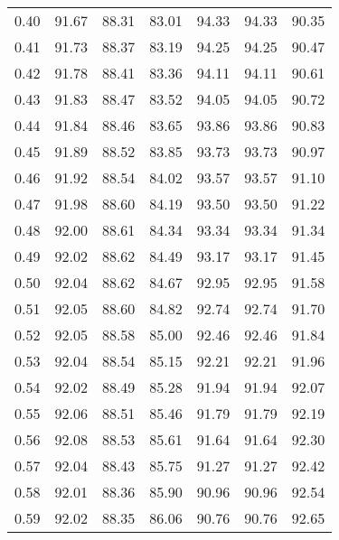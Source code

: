 \begin{tabular}{|c|c|c|c|c|c|c|}
      0.40 &     91.67 &     88.31 &      83.01 &   94.33 &      94.33 &         90.35 \\
      0.41 &     91.73 &     88.37 &      83.19 &   94.25 &      94.25 &         90.47 \\
      0.42 &     91.78 &     88.41 &      83.36 &   94.11 &      94.11 &         90.61 \\
      0.43 &     91.83 &     88.47 &      83.52 &   94.05 &      94.05 &         90.72 \\
      0.44 &     91.84 &     88.46 &      83.65 &   93.86 &      93.86 &         90.83 \\
      0.45 &     91.89 &     88.52 &      83.85 &   93.73 &      93.73 &         90.97 \\
      0.46 &     91.92 &     88.54 &      84.02 &   93.57 &      93.57 &         91.10 \\
      0.47 &     91.98 &     88.60 &      84.19 &   93.50 &      93.50 &         91.22 \\
      0.48 &     92.00 &     88.61 &      84.34 &   93.34 &      93.34 &         91.34 \\
      0.49 &     92.02 &     88.62 &      84.49 &   93.17 &      93.17 &         91.45 \\
      0.50 &     92.04 &     88.62 &      84.67 &   92.95 &      92.95 &         91.58 \\
      0.51 &     92.05 &     88.60 &      84.82 &   92.74 &      92.74 &         91.70 \\
      0.52 &     92.05 &     88.58 &      85.00 &   92.46 &      92.46 &         91.84 \\
      0.53 &     92.04 &     88.54 &      85.15 &   92.21 &      92.21 &         91.96 \\
      0.54 &     92.02 &     88.49 &      85.28 &   91.94 &      91.94 &         92.07 \\
      0.55 &     92.06 &     88.51 &      85.46 &   91.79 &      91.79 &         92.19 \\
      0.56 &     92.08 &     88.53 &      85.61 &   91.64 &      91.64 &         92.30 \\
      0.57 &     92.04 &     88.43 &      85.75 &   91.27 &      91.27 &         92.42 \\
      0.58 &     92.01 &     88.36 &      85.90 &   90.96 &      90.96 &         92.54 \\
      0.59 &     92.02 &     88.35 &      86.06 &   90.76 &      90.76 &         92.65 \\

\end{tabular}
